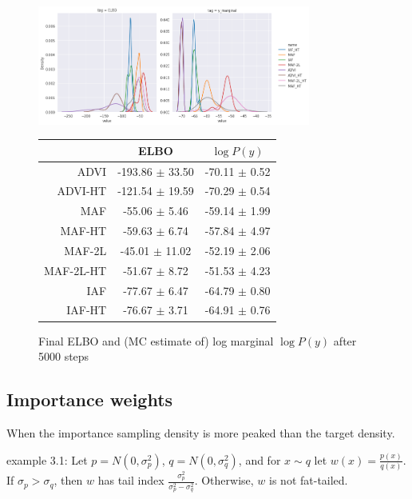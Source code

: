 \documentclass{scrartcl}
\theoremstyle{definition}
\begin{document}
\begin{figure}[H]
    \centering
    \includegraphics[width=0.8\textwidth]{Figures/eight_schools.png}
    \begin{tabular}{rcc}
        \toprule
                  & ELBO                & $\log P(y)$       \\
        \midrule
        ADVI      & -193.86 $\pm$ 33.50 & -70.11 $\pm$ 0.52 \\
        ADVI-HT   & -121.54 $\pm$ 19.59 & -70.29 $\pm$ 0.54 \\
        MAF       & -55.06 $\pm$ 5.46   & -59.14 $\pm$ 1.99 \\
        MAF-HT    & -59.63 $\pm$ 6.74   & -57.84 $\pm$ 4.97 \\
        MAF-2L    & -45.01 $\pm$ 11.02  & -52.19 $\pm$ 2.06 \\
        MAF-2L-HT & -51.67 $\pm$ 8.72   & -51.53 $\pm$ 4.23 \\
        IAF       & -77.67 $\pm$ 6.47   & -64.79 $\pm$ 0.80 \\
        IAF-HT    & -76.67 $\pm$ 3.71   & -64.91 $\pm$ 0.76 \\
        \bottomrule
    \end{tabular}
    \caption{Final ELBO and (MC estimate of) log marginal $\log P(y)$ after 5000 steps}
    \label{fig:blr}
\end{figure}



\subsection{Importance weights}

When the importance sampling density is more peaked than the target density.

\cite{wang2018variational} example 3.1: Let $p = N(0, \sigma_p^2)$, $q = N(0, \sigma_q^2)$,
and for $x \sim q$ let $w(x) = \frac{p(x)}{q(x)}$. If $\sigma_p > \sigma_q$,
then $w$ has tail index $\frac{\sigma_p^2}{\sigma_p^2 - \sigma_q^2}$.
Otherwise, $w$ is not fat-tailed.
\end{document}
